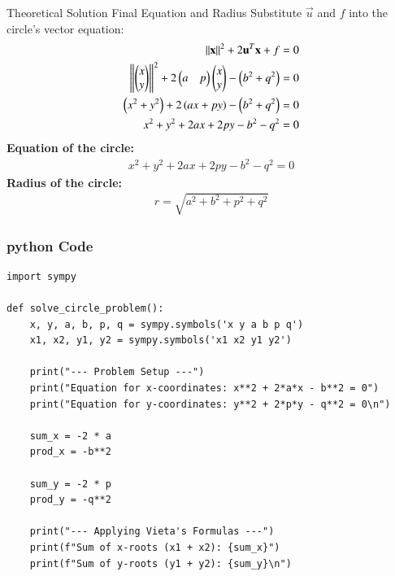 \documentclass{beamer}
\begin{document}
\begin{frame}{Theoretical Solution}
Final Equation and Radius
Substitute $\vec{u}$ and $f$ into the circle's vector equation:
\begin{align*}
    \left\lVert\mathbf{x}\right\rVert^2 + 2\mathbf{u}^T \mathbf{x} + f = 0 \\
    \left\lVert\begin{pmatrix}x \\ y\end{pmatrix}\right\rVert^2 + 2 \begin{pmatrix} a & p \end{pmatrix} \begin{pmatrix}x \\ y\end{pmatrix} - \left(b^2 + q^2\right) = 0 \\
    \left(x^2 + y^2\right) + 2\left(ax + py\right) - \left(b^2 + q^2\right) = 0 \\
    x^2 + y^2 + 2ax + 2py - b^2 - q^2 = 0
\end{align*}
\textbf{Equation of the circle:}
\begin{align*}
    x^2 + y^2 + 2ax + 2py - b^2 - q^2 = 0
\end{align*}
\textbf{Radius of the circle:}
\begin{align*}
    r = \sqrt{a^2 + b^2 + p^2 + q^2}
\end{align*}
    
    
\end{frame}

\begin{frame}[fragile]
    \frametitle{python Code }

    \begin{lstlisting}
import sympy

def solve_circle_problem():
    x, y, a, b, p, q = sympy.symbols('x y a b p q')
    x1, x2, y1, y2 = sympy.symbols('x1 x2 y1 y2')

    print("--- Problem Setup ---")
    print("Equation for x-coordinates: x**2 + 2*a*x - b**2 = 0")
    print("Equation for y-coordinates: y**2 + 2*p*y - q**2 = 0\n")

    sum_x = -2 * a
    prod_x = -b**2

    sum_y = -2 * p
    prod_y = -q**2

    print("--- Applying Vieta's Formulas ---")
    print(f"Sum of x-roots (x1 + x2): {sum_x}")
    print(f"Sum of y-roots (y1 + y2): {sum_y}\n")

   
   


    \end{lstlisting}
\end{frame}
\end{document}

